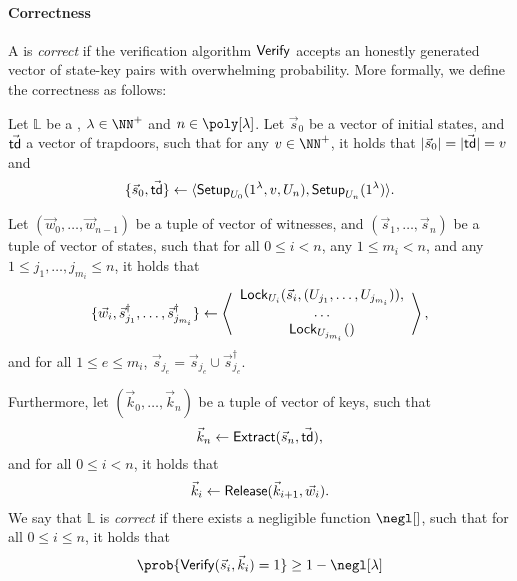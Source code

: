 \paragraph{Correctness} A \sysname is \emph{correct} if the verification algorithm $\mathsf{Verify}$ accepts 
an honestly generated vector of state-key pairs with overwhelming probability. More formally, we define 
the correctness as follows:

\begin{definition}
Let $\mathbb{L}$ be a \sysname, $\lambda \in \NN^+$ and $n \in \poly[\lambda]$. Let $\vec{s}_0$ be a 
vector of initial states, and $\vec{\mathsf{td}}$ a vector of trapdoors, such that for any $v \in \NN^+$, it 
holds that $|\vec{s}_0| = |\vec{\mathsf{td}}| = v$ and
\[
	\{\vec{s}_0, \vec{\mathsf{td}}\} \gets \langle \mathsf{Setup}_{U_0}(1^\lambda, v, U_n),\mathsf{Setup}_{U_n}(1^\lambda) \rangle.
\]

Let $(\vec{w}_0,\ldots,\vec{w}_{n-1})$ be a tuple of vector of witnesses, and $(\vec{s}_1,\ldots,\vec{s}_n)$
be a tuple of vector of states, such that for all $0 \leq i < n$, any $1 \leq m_i < n$, and any $1 \leq 
j_1,\ldots,j_{m_i} \leq n$, it holds that 
\[
	\{\vec{w}_i,\vec{s}_{j_1}^\dag,\ldots,\vec{s}_{j_{m_i}}^\dag\} \gets
	\left\langle 
		\begin{array}{c}
			\mathsf{Lock}_{U_i}(\vec{s}_i, (U_{j_1},\ldots,U_{j_{m_i}})), 	\\
			\ldots 													\\
			\mathsf{Lock}_{U_{j_{m_i}}}() 									\\
		\end{array}
	\right\rangle,
\]
and for all $1 \leq e \leq m_i$, $\vec{s}_{j_e} = \vec{s}_{j_e} \cup \vec{s}_{j_e}^\dag$.

Furthermore, let $(\vec{k}_0,\ldots,\vec{k}_n)$ be a tuple of vector of keys, such that 
\[
	\vec{k}_n \gets \mathsf{Extract}(\vec{s}_n,\vec{\mathsf{td}}),
\]
and for all $0 \leq i < n$, it holds that
\[
	\vec{k}_i \gets \mathsf{Release}(\vec{k}_{i+1},\vec{w}_i).
\]
We say that $\mathbb{L}$ is \emph{correct} if there exists a negligible function $\negl[]$, such that 
for all $0 \leq i \leq n$, it holds that
\[
	\prob{\Verify(\vec{s}_i, \vec{k}_i) = 1} \geq 1 - \negl[\lambda]
\]
\end{definition}